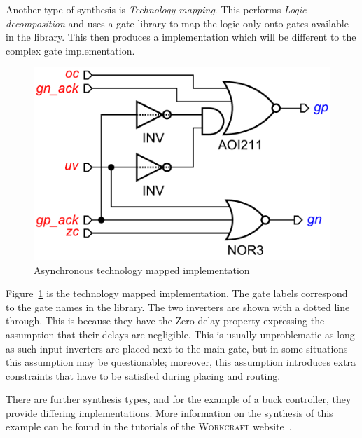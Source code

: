 \documentclass[british,compsoc]{IEEEtran}
\newcommand{\noun}[1]{\textsc{#1}}
\begin{document}
Another type of synthesis is \emph{Technology mapping}.
This performs \emph{Logic decomposition} and uses a gate library to map the logic only onto gates available in the library.
This then produces a implementation which will be different to the complex gate implementation.

\begin{figure}[h]
\begin{centering}
\includegraphics[scale=0.3]{Images/circuit-buck-mapped-pfy-wc.pdf}
\par\end{centering}

\protect\caption{\label{fig:tech-mapped-circuit}Asynchronous technology mapped implementation}
\end{figure}

Figure~\ref{fig:tech-mapped-circuit} is the technology mapped implementation.  The gate labels correspond to the gate names in the library.
The two inverters are shown with a dotted line through. This is because they have the Zero delay property expressing the assumption that their delays are negligible.
This is usually unproblematic as long as such input inverters are placed next to the main gate, but in some situations this assumption may be questionable;
moreover, this assumption introduces extra constraints that have to be satisfied during placing and routing.

There are further synthesis types, and for the example of a buck controller, they provide differing implementations.
More information on the synthesis of this example can be found in the tutorials of the \noun{Workcraft} website~\cite{Workcraft_website}.

\end{document}
